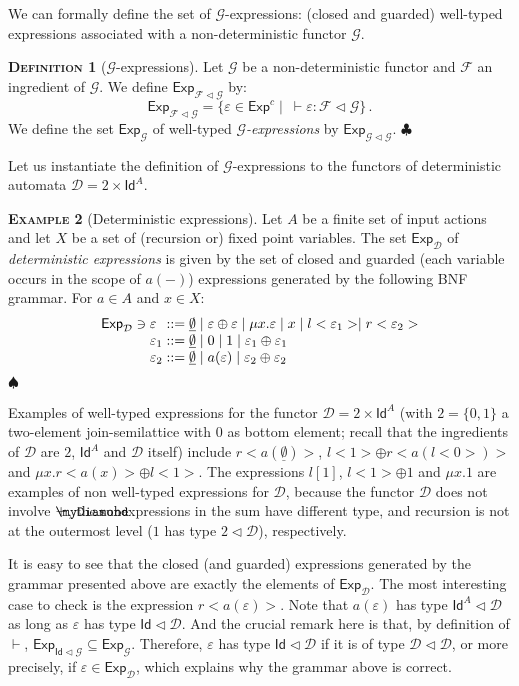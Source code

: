 \documentclass{LMCS}
\newcommand\D{\mathcal{D}}
\newcommand\E\varepsilon
\newcommand\Exp{\mathsf{Exp}}
\newcommand\id{\mathsf{Id}}
\newcommand\G{\mathcal{G}}
\newcommand\F{\mathcal{F}}
\newcommand\emp{\underline\emptyset}
\newcommand{\myplus}{\mathbin{\rlap{$\myDiamond$}\hspace*{.01cm}\raisebox{.14ex}{$+$}}}
\def\hyph{-\penalty0\hskip0pt\relax}
\theoremstyle{definition}
\newtheorem{mydefinition}{\textsc{Definition}}[section]
\theoremstyle{plain}
\theoremstyle{plain}
\theoremstyle{plain}
\theoremstyle{plain}
\theoremstyle{definition}
\theoremstyle{definition}
\newtheorem{myexample}[mydefinition]{\textsc{Example}}
\newenvironment{definition}{
\begin{mydefinition}}
    {\hfill$\clubsuit$\end{mydefinition}}
\newenvironment{example}{
\begin{myexample}}
    {\hfill$\spadesuit$\end{myexample}}
\begin{document}
We can formally define the set of $\G$-expressions: (closed and
guarded) well-typed
expressions associated with a non\hyph deterministic functor $\G$.

\begin{definition}[$\G$-expressions]
Let $\G$ be a non\hyph deterministic functor and $\F$ an ingredient of
$\G$.
We define $\Exp_{\F\lhd \G}$ by:
\[
\Exp_{\F\lhd \G} = \{\E \in \Exp^c \mid\ \vdash\E \colon \F\lhd \G\}\,.
\]
We define the set $\Exp_\G$ of well-typed {\em
$\G$-expressions\/} by $\Exp_{\G\lhd \G}$.
\end{definition}
Let us instantiate the definition of $\G$-expressions to the functors of
deterministic automata $\D = 2\times \id^A$.
\begin{example}[Deterministic expressions]
Let $A$ be a finite set of input actions and let $X$ be a set of
(recursion or) fixed point variables. The set $\Exp_\D$ of {\em deterministic
expressions\/} is given by the set of closed and guarded (each
variable occurs in the scope of $a(-)$) expressions generated by the following BNF grammar. For $a \in A$ and $x \in X$:
\[
\begin{array} {l@{\;}l@{\;}c@{\;}l}
\Exp_\D\ni &\E &::=&  \emp \mid \E \oplus \E \mid 
         \mu x.\E \mid 
 x \mid l<\E_1> \mid r<\E_2> \\
&\E_1 &::=& \emp \mid 0 \mid 1 \mid \E_1\oplus\E_1\\
&\E_2 &::=&  \emp \mid a(\E) \mid \E_2\oplus\E_2
\end{array}
        \]
\end{example}
Examples of well-typed expressions for the functor $\D = 2\times \id^A$
(with $2=\{0,1\}$ a two-element join-semilattice with $0$ as bottom
element; recall that the ingredients of $\D$ are $2$, $\id^A$ and $\D$
itself) include
$r<a(\emp)>$, $l<1>\oplus r<a(l<0>)>$ and $\mu x. r<a(x)> \oplus
l<1>$.
The expressions $l[1]$, $l<1>\oplus 1$ and $\mu x. 1$ are examples of
non well-typed
expressions for $\D$, because the functor $\D$ does not involve $\myplus$, the
subexpressions in the sum have different type, and
recursion is not at the outermost level ($1$ has type $2\lhd \D$),
respectively.

It is easy to see that the closed (and guarded) expressions generated
by the grammar presented above are exactly the elements of
$\Exp_\D$. The most interesting case to check is the expression
$r<a(\E)>$. Note that $a(\E)$ has type
$\id^A\lhd \D$ as long as $\E$ has type $\id \lhd \D$. And the crucial
remark here is that, by definition of $\vdash$, $\Exp_{\id\lhd
\G} \subseteq \Exp_\G$.  
Therefore, $\E$ has type $\id \lhd \D$ if it is of type
$\D\lhd \D$, or more precisely, if $\E\in \Exp_\D$, which explains why the
grammar above is correct. 
\end{document}

